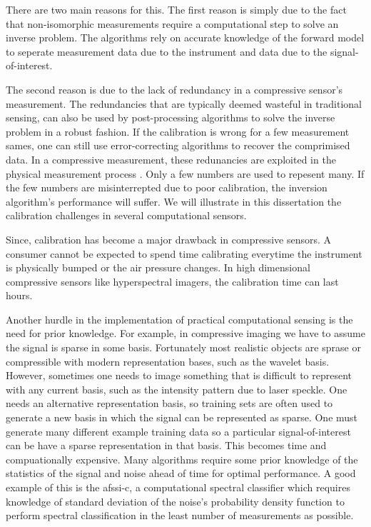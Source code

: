 There are two main reasons for this. The first reason is simply due to the fact that non-isomorphic measurements require a computational step to solve an inverse problem. The algorithms rely on accurate knowledge of the forward model to seperate measurement data due to the instrument and data due to the signal-of-interest. 

The second reason is due to the lack of redundancy in a compressive sensor's measurement. The redundancies that are typically deemed wasteful in traditional sensing, can also be used by post-processing algorithms to solve the inverse problem in a robust fashion. If the calibration is wrong for a few measurement sames, one can still use error-correcting algorithms to recover the comprimised data. In a compressive measurement, these redunancies are exploited in the physical measurement process \cite{gehm2013calibration}. Only a few numbers are used to repesent many. If the few numbers are misinterrepted due to poor calibration, the inversion algorithm's performance will suffer. We will illustrate in this dissertation the calibration challenges in several computational sensors. 

Since, calibration has become a major drawback in \gls{compressive sensors}. A consumer cannot be expected to spend time calibrating everytime the instrument is physically bumped or the air pressure changes. In high dimensional compressive sensors like hyperspectral imagers, the calibration time can last hours.

Another hurdle in the implementation of practical computational sensing is the need for prior knowledge. For example, in compressive imaging we have to assume the signal is sparse in some basis. Fortunately most realistic objects are sprase or compressible with modern representation bases, such as the wavelet basis. However, sometimes one needs to image something that is difficult to represent with any current basis, such as the intensity pattern due to laser speckle. One needs an alternative representation basis, so training sets are often used to generate a new basis in which the signal can be represented as sparse. One must generate many different example training data so a particular signal-of-interest can be have a sparse representation in that basis. This becomes time and compuationally expensive. Many algorithms require some prior knowledge of the statistics of the signal and noise ahead of time for optimal performance. A good example of this is the \gls{afssi-c}, a computational spectral classifier which requires knowledge of standard deviation of the noise's probability density function to perform spectral classification in the least number of measurements as possible.


